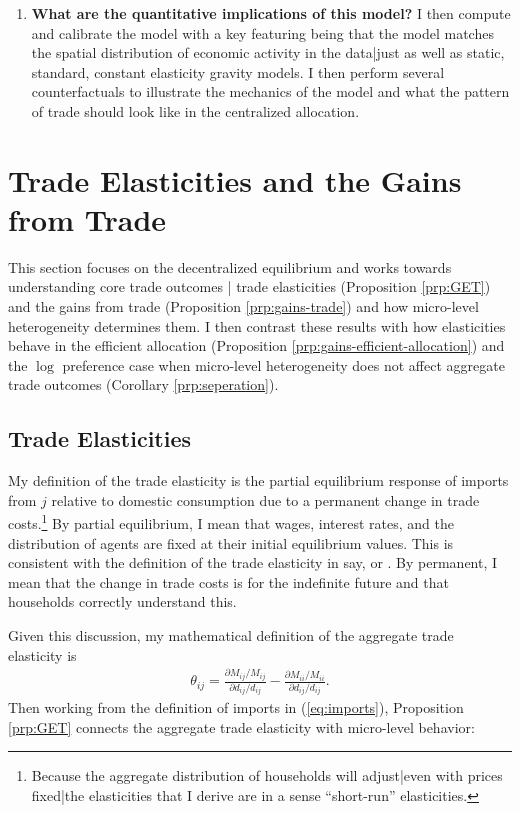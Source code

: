 \documentclass[12pt,pdftex]{article}
\begin{document}
\begin{onehalfspacing}
\begin{enumerate}
\item \textbf{What are the quantitative implications of this model?} I then compute and calibrate the model with a key featuring being that the model matches the spatial distribution of economic activity in the data|just as well as static, standard, constant elasticity gravity models. I then perform several counterfactuals to illustrate the mechanics of the model and what the pattern of trade should look like in the centralized allocation.
\end{enumerate}

\section{Trade Elasticities and the Gains from Trade}

This section focuses on the decentralized equilibrium and works towards understanding core trade outcomes | trade elasticities (Proposition \ref{prp:GET}) and the gains from trade (Proposition \ref{prp:gains-trade}) and how micro-level heterogeneity determines them. I then contrast these results with how elasticities behave in the efficient allocation (Proposition \ref{prp:gains-efficient-allocation}) and the $\log$ preference case when micro-level heterogeneity does not affect aggregate trade outcomes (Corollary \ref{prp:seperation}).

\subsection{Trade Elasticities}\label{sec:trade-elasticity}

My definition of the trade elasticity is the partial equilibrium response of imports from $j$ relative to domestic consumption due to a permanent change in trade costs.\footnote{Because the aggregate distribution of households will adjust|even with prices fixed|the elasticities that I derive are in a sense ``short-run'' elasticities.} By partial equilibrium, I mean that wages, interest rates, and the distribution of agents are fixed at their initial equilibrium values. This is consistent with the definition of the trade elasticity in say, \citet{arkolakis2012new} or \citet{simonovska2014elasticity}. By permanent, I mean that the change in trade costs is for the indefinite future and that households correctly understand this.

Given this discussion, my mathematical definition of the aggregate trade elasticity is
\begin{align}
\theta_{ij} = \frac{\partial M_{ij} / M_{ij}}{\partial d_{ij} / d_{ij}}  - \frac{\partial M_{ii} / M_{ii}}{\partial d_{ij} / d_{ij}}.
\label{eq:def_trade_elasticity}
\end{align}
Then working from the definition of imports in (\ref{eq:imports}), Proposition \ref{prp:GET} connects the aggregate trade elasticity with micro-level behavior:


\end{onehalfspacing}
\end{document}
